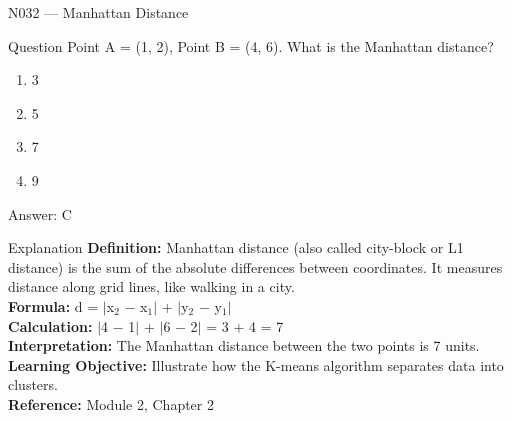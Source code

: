 \documentclass[aspectratio=169,8pt]{beamer}
\begin{document}
	\begin{frame}{N032 --- Manhattan Distance}
		\begin{block}{Question}
			Point A = (1, 2), Point B = (4, 6). What is the Manhattan distance?
			\begin{enumerate}
				\item 3
				\item 5
				\item 7
				\item 9
			\end{enumerate}
		\end{block}
		\begin{exampleblock}{Answer: C}\end{exampleblock}
		\begin{block}{Explanation}
			\textbf{Definition:} Manhattan distance (also called city-block or L1 distance) is the sum of the absolute differences between coordinates. It measures distance along grid lines, like walking in a city.\\
			\textbf{Formula:} d = $|$x$_{2}$ $-$ x$_{1}$$|$ + $|$y$_{2}$ $-$ y$_{1}$$|$\\
			\textbf{Calculation:} $|$4 $-$ 1$|$ + $|$6 $-$ 2$|$ = 3 + 4 = 7\\
			\textbf{Interpretation:} The Manhattan distance between the two points is 7 units.\\
			\textbf{Learning Objective:} Illustrate how the K-means algorithm separates data into clusters.\\
			\textbf{Reference:} Module 2, Chapter 2
		\end{block}
	\end{frame}
	
\end{document}
